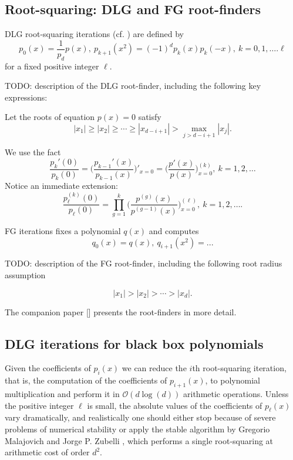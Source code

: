 \documentclass[runningheads]{llncs}
\begin{document}
\subsection{Root-squaring: DLG and FG root-finders}
DLG root-squaring iterations (cf. \cite{10.2307/2310626}) are defined by
\begin{equation}\label{eqdnd}
 p_0(x)=\frac{1}{p_d}p(x),~p_{k+1}(x^2)=(-1)^ d p_k(x)
p_k(-x),~k=0,1,\dots.\ell
\end{equation}
for a fixed positive integer $\ell$.

TODO: description of the DLG root-finder, including the following key expressions:

Let the  roots of equation $p(x)=0$ satisfy
\begin{equation}\label{eqnndcrs}
 |x_1|\ge|x_2|\ge\cdots\ge |x_{d-i+1}|>\max_{j>d-i+1}|x_j|.
 \end{equation}

We use the fact
 \begin{equation}\label{eqdndrt0}\frac{p_{k}'(0)}{p_{k}(0)}=\Big(\frac{p_{k-1}'(x)}{p_{k-1}(x)}\Big)'_{x=0}=\Big(\frac{p'(x)}{p(x)}\Big)^{(k)}_{x=0},~k=1,2,\dots
\end{equation}
Notice an immediate extension:
\begin{equation}\label{eqdndrth} \frac{p_{{\ell}}^{(k)}(0)}{p_{\ell}(0)}=\prod_{g=1}^k\Bigg(\frac{p^{(g)}(x)}{p^{(g-1)}(x)}\Bigg)_{x=0}^{(\ell)},~k=1,2,\dots.
\end{equation}

FG iterations fixes a polynomial $q(x)$ and computes
\begin{equation}\label{fg}
q_0(x)=q(x),~q_{i+1}(x^2)= ...
\end{equation}

TODO: description of the FG root-finder, including the following root radius assumption

\begin{equation}\label{eqsprn}
|x_1|>|x_2|>\cdots>|x_d|.
\end{equation}


The companion paper [] presents the root-finders in more detail.

\subsection{DLG iterations for black box polynomials}
Given the coefficients of
$p_i(x)$
we can reduce the $i$th root-squaring iteration, that is, the computation of
the coefficients of  $p_{i+1}(x)$, to polynomial multiplication and perform it in $\mathcal{O}(d\log(d))$ arithmetic operations.
Unless the positive integer $\ell$ is small, the absolute values of the coefficients
of $p_{\ell}(x)$ vary  dramatically, and realistically one should either stop because of severe problems of numerical stability or apply the stable algorithm by Gregorio Malajovich and Jorge  P. Zubelli \cite{Malajovich2001OnTG}, which performs a single root-squaring at  arithmetic cost of order $d^2$.
\end{document}
